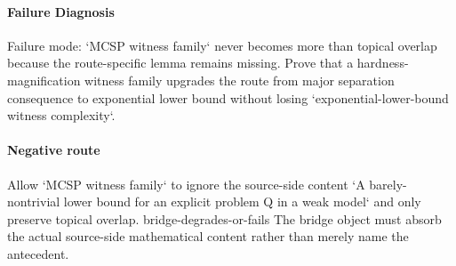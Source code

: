 \documentclass[11pt]{article}
\begin{document}
\paragraph{Failure Diagnosis}
Failure mode: `MCSP witness family` never becomes more than topical overlap because the route-specific lemma remains missing. Prove that a hardness-magnification witness family upgrades the route from major separation consequence to exponential lower bound without losing `exponential-lower-bound witness complexity`.
\paragraph{Negative route}
Allow `MCSP witness family` to ignore the source-side content `A barely-nontrivial lower bound for an explicit problem Q in a weak model` and only preserve topical overlap. bridge-degrades-or-fails The bridge object must absorb the actual source-side mathematical content rather than merely name the antecedent.
\end{document}
